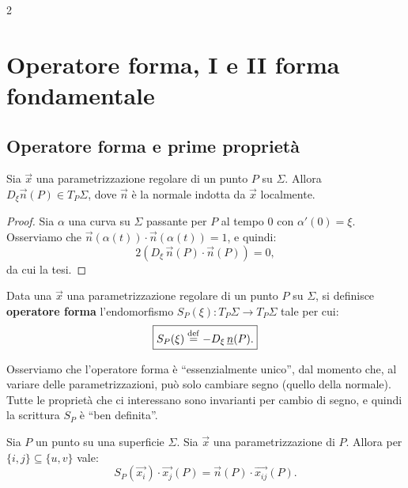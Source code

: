 \begin{multicols*}{2}
    \section{Operatore forma, I e II forma fondamentale}

    \subsection{Operatore forma e prime proprietà}

    \begin{proposition}
        Sia $\vec{x}$ una parametrizzazione regolare di un punto
        $P$ su $\Sigma$. Allora $D_\xi \vec{n}(P) \in T_P \Sigma$,
        dove $\vec{n}$ è la normale indotta da $\vec{x}$ localmente.
    \end{proposition}

    \begin{proof}
        Sia $\alpha$ una curva su $\Sigma$ passante per $P$ al tempo $0$
        con $\alpha'(0) = \xi$.
        Osserviamo che $\vec{n}(\alpha(t)) \cdot \vec{n}(\alpha(t)) = 1$,
        e quindi:
        \[
            2 (D_\xi \, \vec{n}(P) \cdot \vec{n}(P)) = 0,
        \]
        da cui la tesi.
    \end{proof}

    \begin{definition}
        Data una $\vec{x}$ una parametrizzazione regolare di un
        punto $P$ su $\Sigma$, si definisce \textbf{operatore forma}
        l'endomorfismo $S_P(\xi) : T_P \Sigma \to T_P \Sigma$ tale per cui:
        \[
            \boxed{S_P(\xi) \overset{\mathrm{def}}{=} - D_\xi \, {\underline{n}}(P).}
        \]
    \end{definition}

    \begin{remark}
        Osserviamo che l'operatore forma è ``essenzialmente unico'', dal momento
        che, al variare delle parametrizzazioni, può solo cambiare segno (quello della
        normale). Tutte le proprietà che ci interessano sono invarianti per cambio di
        segno, e quindi la scrittura $S_P$ è ``ben definita''.
    \end{remark}

    \begin{lemma} \label{lem:formula_operatore_forma}
        Sia $P$ un punto su una superficie $\Sigma$. Sia $\vec{x}$ una
        parametrizzazione di $P$. Allora per $\{i, j\} \subseteq \{u, v\}$ vale:
        \[
            \boxed{S_P(\vec{x_i}) \cdot \vec{x_j}(P) = \vec{n}(P) \cdot \vec{x_{ij}}(P).}
        \]
    \end{lemma}


\end{multicols*}
